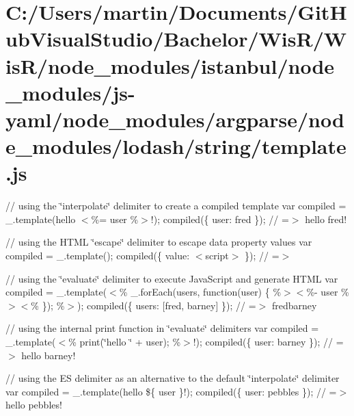 \hypertarget{_c_1_2_users_2martin_2_documents_2_git_hub_visual_studio_2_bachelor_2_wis_r_2_wis_r_2node_module3a8e07dc53882f57d4a430409610cbd9}{}\section{C\+:/\+Users/martin/\+Documents/\+Git\+Hub\+Visual\+Studio/\+Bachelor/\+Wis\+R/\+Wis\+R/node\+\_\+modules/istanbul/node\+\_\+modules/js-\/yaml/node\+\_\+modules/argparse/node\+\_\+modules/lodash/string/template.\+js}
// using the \char`\"{}interpolate\char`\"{} delimiter to create a compiled template var compiled = \+\_\+.\+template(\textquotesingle{}hello $<$\%= user \%$>$!\textquotesingle{}); compiled(\{ \textquotesingle{}user\textquotesingle{}\+: \textquotesingle{}fred\textquotesingle{} \}); // =$>$ \textquotesingle{}hello fred!\textquotesingle{}

// using the H\+T\+M\+L \char`\"{}escape\char`\"{} delimiter to escape data property values var compiled = \+\_\+.\+template(\textquotesingle{}); compiled(\{ \textquotesingle{}value\textquotesingle{}\+: \textquotesingle{}$<$script$>$\textquotesingle{} \}); // =$>$ \textquotesingle{}

// using the \char`\"{}evaluate\char`\"{} delimiter to execute Java\+Script and generate H\+T\+M\+L var compiled = \+\_\+.\+template(\textquotesingle{}$<$\% \+\_\+.\+for\+Each(users, function(user) \{ \%$>$$<$\%-\/ user \%$>$$<$\% \}); \%$>$\textquotesingle{}); compiled(\{ \textquotesingle{}users\textquotesingle{}\+: \mbox{[}\textquotesingle{}fred\textquotesingle{}, \textquotesingle{}barney\textquotesingle{}\mbox{]} \}); // =$>$ \textquotesingle{}fredbarney\textquotesingle{}

// using the internal {\ttfamily print} function in \char`\"{}evaluate\char`\"{} delimiters var compiled = \+\_\+.\+template(\textquotesingle{}$<$\% print(\char`\"{}hello \char`\"{} + user); \%$>$!\textquotesingle{}); compiled(\{ \textquotesingle{}user\textquotesingle{}\+: \textquotesingle{}barney\textquotesingle{} \}); // =$>$ \textquotesingle{}hello barney!\textquotesingle{}

// using the E\+S delimiter as an alternative to the default \char`\"{}interpolate\char`\"{} delimiter var compiled = \+\_\+.\+template(\textquotesingle{}hello \$\{ user \}!\textquotesingle{}); compiled(\{ \textquotesingle{}user\textquotesingle{}\+: \textquotesingle{}pebbles\textquotesingle{} \}); // =$>$ \textquotesingle{}hello pebbles!\textquotesingle{}

